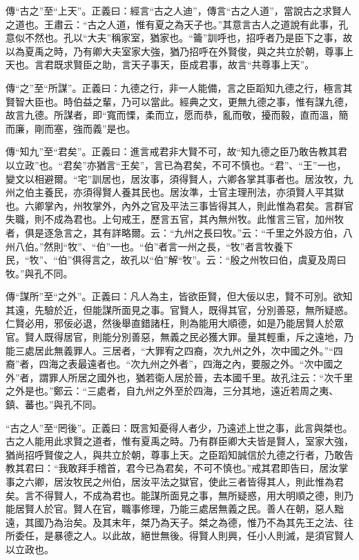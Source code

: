 {\noindent\zhuan{}\fzbyks 傳“古之”至“上天”。正義曰：經言“古之人迪”，傳言“古之人道”，當說古之求賢人之道也。王肅云：“古之人道，惟有夏之為天子也。”其意言古人之道說有此事，孔意似不然也。孔以“大夫”稱家室，猶家也。“籥”訓呼也，招呼者乃是臣下之事，故以為夏禹之時，乃有卿大夫室家大強，猶乃招呼在外賢俊，與之共立於朝，尊事上天也。言君既求賢臣之助，言天子事天，臣成君事，故言“共尊事上天”。 \par}

{\noindent\zhuan{}\fzbyks 傳“之”至“所謀”。正義曰：九德之行，非一人能備，言之臣蹈知九德之行，極言其賢智大臣也。時伯益之輩，乃可以當此。經典之文，更無九德之事，惟有謀九德，故言九德。所謀者，即“寬而慄，柔而立，愿而恭，亂而敬，擾而毅，直而溫，簡而廉，剛而塞，強而義”是也。 \par}

{\noindent\zhuan{}\fzbyks 傳“知九”至“君矣”。正義曰：進言戒君非大賢不可，故“知九德之臣乃敢告教其君以立政”也。“君矣”亦猶言“王矣”，言已為君矣，不可不慎也。“君”、“王”一也，變文以相避爾。“宅”訓居也，居汝事，須得賢人，六卿各掌其事者也。居汝牧，九州之伯主養民，亦須得賢人養其民也。居汝準，士官主理刑法，亦須賢人平其獄也。六卿掌內，州牧掌外，內外之官及平法三事皆得其人，則此惟為君矣。言群官失職，則不成為君也。上句戒王，歷言五官，其內無州牧。此惟言三官，加州牧者，俱是逐急言之，其有詳略爾。云：“九州之長曰牧。”云：“千里之外設方伯，八州八伯。”然則“牧”、“伯”一也。“伯”者言一州之長，“牧”者言牧養下民，“牧”、“伯”俱得言之，故孔以“伯”解“牧”。云：“殷之州牧曰伯，虞夏及周曰牧。”與孔不同。 \par}

{\noindent\zhuan{}\fzbyks 傳“謀所”至“之外”。正義曰：凡人為主，皆欲臣賢，但大佞以忠，賢不可別。欲知其遠，先驗於近，但能謀所面見之事。官賢人，既得其官，分別善惡，無所疑惑。仁賢必用，邪佞必退，然後舉直錯諸枉，則為能用大順德，如是乃能居賢人於眾官。賢人既得居官，則能分別善惡，無義之民必獲大罪。量其輕重，斥之遠地，乃能三處居此無義罪人。三居者，“大罪宥之四裔，次九州之外，次中國之外。”“四裔”者，四海之表最遠者也。“次九州之外者”，四海之內，要服之外。“次中國之外”者，謂罪人所居之國外也，猶若衛人居於晉，去本國千里。故孔注云：“次千里之外是也。”鄭云：“三處者，自九州之外至於四海，三分其地，遠近若周之夷、鎮、蕃也。”與孔不同。 \par}

{\noindent\shu{}\fzkt “古之人”至“罔後”。正義曰：既言知憂得人者少，乃遠述上世之事，此言與桀也。古之人能用此求賢之道者，惟有夏禹之時。乃有群臣卿大夫皆是賢人，室家大強，猶尚招呼賢俊之人，與共立於朝，尊事上天。之臣蹈知誠信於九德之行者，乃敢告教其君曰：“我敢拜手稽首，君今已為君矣，不可不慎也。”戒其君即告曰，居汝掌事之六卿，居汝牧民之州伯，居汝平法之獄官，使此三者皆得其人，則此惟為君矣。言不得賢人，不成為君也。能謀所面見之事，無所疑惑，用大明順之德，則乃能居賢人於官。賢人在官，職事修理，乃能三處居無義之民。善人在朝，惡人黜遠，其國乃為治矣。及其末年，桀乃為天子。桀之為德，惟乃不為其先王之法、往所委任，是暴德之人。以此故，絕世無後。得賢人則興，任小人則滅，是須官賢人以立政也。 \par}

